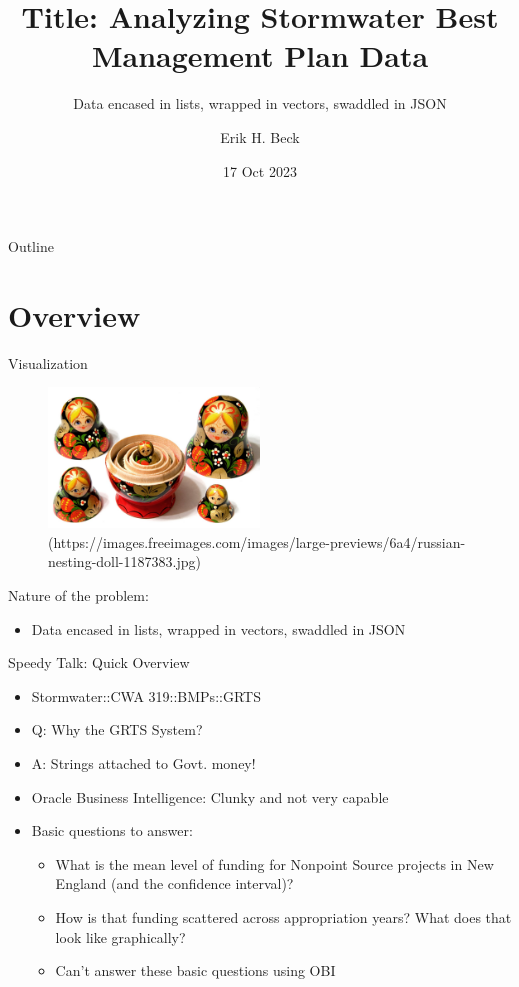 \documentclass{beamer}
\title{Title: Analyzing Stormwater Best Management Plan Data}
\subtitle{Data encased in lists, wrapped in vectors, swaddled in JSON}
\author{Erik H. Beck}
\institute{USEPA R1}
\date{17 Oct 2023}
\begin{document}
\begin{frame}
    \titlepage 
\end{frame}



\begin{frame}{Outline}
    \tableofcontents
\end{frame}



\section{Overview}
\begin{frame}{Visualization}
  \begin{figure}
    \centering
       \includegraphics[width=0.50\textwidth]{russian-nesting-doll-1187383.jpg}
       \caption{(https://images.freeimages.com/images/large-previews/6a4/russian-nesting-doll-1187383.jpg)}
  \end{figure}
  Nature of the problem:
  \begin {itemize}
       \item Data encased in lists, wrapped in vectors, swaddled in JSON
  \end{itemize}
\end{frame}

%

\begin{frame}{Speedy Talk: Quick Overview}
  \begin{itemize}
   \item Stormwater::CWA 319::BMPs::GRTS
   \item Q: Why the GRTS System?
   \item A: Strings attached to Govt. money!
   \item Oracle Business Intelligence: Clunky and not very capable
   \item Basic questions to answer:
   \begin{itemize}
        \item What is the mean level of funding for Nonpoint Source
          projects in New England (and the confidence interval)?
	\item How is that funding scattered across appropriation
          years? What does that look like graphically?
	\item Can't answer these basic questions using OBI
   \end{itemize}
  \end{itemize}
\end{frame}
\end{document}
